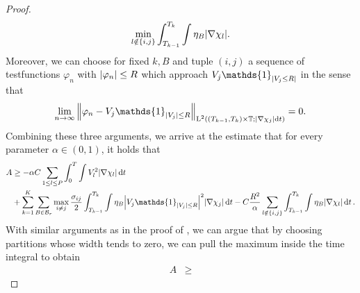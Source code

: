 \begin{proof}
\begin{align*}
				\min_{ l \notin \{ i , j \} }
					\int_{ T_{ k - 1 } }^{ T_{k } }
						\int
							\eta_{ B }
						\abs{ \nabla \chi_{ l } }.
	\end{align*}
	Moreover, we can choose for fixed $k , B $ and tuple $ (i, j ) $ a sequence 
	of testfunctions $ \varphi_{ n } $ with $ \abs{ \varphi_{ n } } \leq R $ 
	which approach $ V_{ j } \mathds{ 1 }_{ \abs{ V_{ j } \leq R } } $
	in the sense that
	\begin{equation*}
		\lim_{ n \to \infty }
		\norm{ \varphi_{ n } - V_{ j } \mathds{ 1 }_{ \abs{ V_{ j } } \leq R } 
		}_{ \lp^{ 2 } \left(
			( T_{ k - 1 }, T_{ k } ) \times \flattorus ;
			\abs{ \nabla \chi_{ j } } \dd{ t }
			\right)
		}
		=
		0.
	\end{equation*}
	Combining these three arguments, we arrive at the estimate that for every 
	parameter $ \alpha \in ( 0 , 1 ) $, it holds that
	\begin{align*}
		A & \geq
		- \alpha C
		\sum_{ 1 \leq l \leq P }
			\int_{ 0 }^{ T }
				\int
					V_{ l }^{ 2 }
				\abs{ \nabla \chi_{ l } }
			\dd{ t }
		\\
		& +
		\sum_{ k = 1 }^{ K }
			\sum_{ B \in \mathcal{ B }_{ r } }
				\max_{ i \neq j }
					\frac{ \sigma_{ i j } }{ 2 }
					\int_{ T_{ k - 1 } }^{ T_{ k } } 
						\int
							\eta_{ B }
							\abs{ V_{ j } \mathds{ 1 }_{ \abs{ V_{ j } } \leq R 
							} }^{ 2 }
						\abs{ \nabla \chi_{ j } }
					\dd{ t }
					- 
					C \frac{ R^{ 2 } }{ \alpha }
					\sum_{ l \notin \{ i , j \} }
						\int_{ T_{ k - 1 } }^{ T_{ k } }
							\int
								\eta_{ B }
							\abs{ \nabla \chi_{ l } }
						\dd{ t }.
	\end{align*}
	With similar arguments as in the proof of 
	, we can argue that by choosing 
	partitions whose width tends to zero, we can pull the maximum inside the 
	time integral to obtain 
	\begin{align*}
		A & \geq
	\end{align*}
\end{proof}


